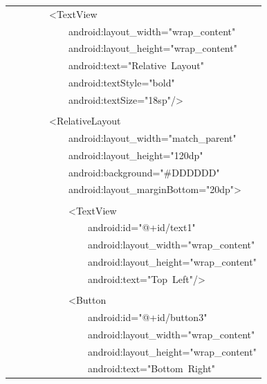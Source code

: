 \documentclass[a4paper,12pt]{article}
\begin{document}
\begin{longtable}{|p{}|}
{\ttfamily\small \ \ \ \ \ \ \ \ \textless{}TextView} \\
{\ttfamily\small \ \ \ \ \ \ \ \ \ \ \ \ android:layout\_width="wrap\_content"} \\
{\ttfamily\small \ \ \ \ \ \ \ \ \ \ \ \ android:layout\_height="wrap\_content"} \\
{\ttfamily\small \ \ \ \ \ \ \ \ \ \ \ \ android:text="Relative\ Layout"} \\
{\ttfamily\small \ \ \ \ \ \ \ \ \ \ \ \ android:textStyle="bold"} \\
{\ttfamily\small \ \ \ \ \ \ \ \ \ \ \ \ android:textSize="18sp"/\textgreater{}} \\
\strut \\
{\ttfamily\small \ \ \ \ \ \ \ \ \textless{}RelativeLayout} \\
{\ttfamily\small \ \ \ \ \ \ \ \ \ \ \ \ android:layout\_width="match\_parent"} \\
{\ttfamily\small \ \ \ \ \ \ \ \ \ \ \ \ android:layout\_height="120dp"} \\
{\ttfamily\small \ \ \ \ \ \ \ \ \ \ \ \ android:background="\#DDDDDD"} \\
{\ttfamily\small \ \ \ \ \ \ \ \ \ \ \ \ android:layout\_marginBottom="20dp"\textgreater{}} \\
\strut \\
{\ttfamily\small \ \ \ \ \ \ \ \ \ \ \ \ \textless{}TextView} \\
{\ttfamily\small \ \ \ \ \ \ \ \ \ \ \ \ \ \ \ \ android:id="@+id/text1"} \\
{\ttfamily\small \ \ \ \ \ \ \ \ \ \ \ \ \ \ \ \ android:layout\_width="wrap\_content"} \\
{\ttfamily\small \ \ \ \ \ \ \ \ \ \ \ \ \ \ \ \ android:layout\_height="wrap\_content"} \\
{\ttfamily\small \ \ \ \ \ \ \ \ \ \ \ \ \ \ \ \ android:text="Top\ Left"/\textgreater{}} \\
\strut \\
{\ttfamily\small \ \ \ \ \ \ \ \ \ \ \ \ \textless{}Button} \\
{\ttfamily\small \ \ \ \ \ \ \ \ \ \ \ \ \ \ \ \ android:id="@+id/button3"} \\
{\ttfamily\small \ \ \ \ \ \ \ \ \ \ \ \ \ \ \ \ android:layout\_width="wrap\_content"} \\
{\ttfamily\small \ \ \ \ \ \ \ \ \ \ \ \ \ \ \ \ android:layout\_height="wrap\_content"} \\
{\ttfamily\small \ \ \ \ \ \ \ \ \ \ \ \ \ \ \ \ android:text="Bottom\ Right"} \\

\end{longtable}
\end{document}
